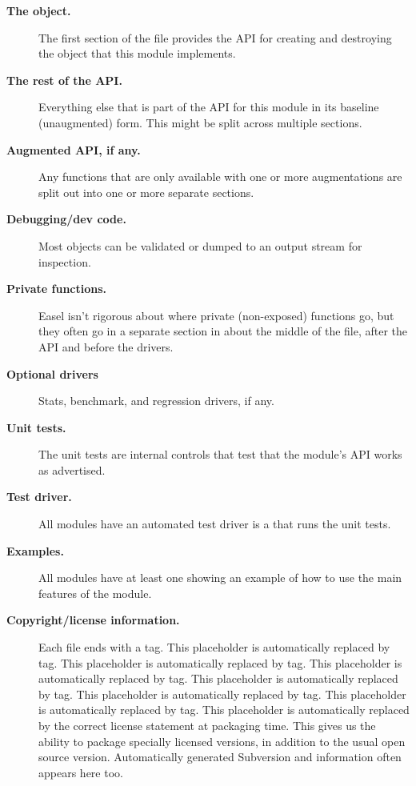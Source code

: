 \begin{description}
\item[\textbf{The  object.}]
  The first section of the file provides the API for creating and
  destroying the object that this module implements.

\item[\textbf{The rest of the API.}]
  Everything else that is part of the API for this module in its
  baseline (unaugmented) form. This might be split across multiple
  sections.

\item[\textbf{Augmented API, if any.}]
  Any functions that are only available with one or more augmentations
  are split out into one or more separate sections. 

\item[\textbf{Debugging/dev code.}]
  Most objects can be validated or dumped to an output stream
  for inspection.

\item[\textbf{Private functions.}]
  Easel isn't rigorous about where private (non-exposed) functions go,
  but they often go in a separate section in about the middle of the
   file, after the API and before the drivers.

\item[\textbf{Optional drivers}] Stats, benchmark, and regression
  drivers, if any. 

\item [\textbf{Unit tests.}]
  The unit tests are internal controls that test that the module's API
  works as advertised.

\item [\textbf{Test driver.}]
  All modules have an automated test driver is a  that
  runs the unit tests.
 
\item [\textbf{Examples.}]
  All modules have at least one  showing an example of
  how to use the main features of the module.

\item [\textbf{Copyright/license information.}]  Each file ends with a
   tag. This placeholder is automatically replaced by
   tag. This placeholder is automatically replaced by
   tag. This placeholder is automatically replaced by
   tag. This placeholder is automatically replaced by
  \ccode{} tag. This placeholder is automatically replaced by
   tag. This placeholder is automatically replaced by
   tag. This placeholder is automatically replaced by
  the correct license statement at packaging time. This gives us the
  ability to package specially licensed versions, in addition to the
  usual open source version. Automatically generated Subversion
   and  information often appears
  here too.

\end{description}

